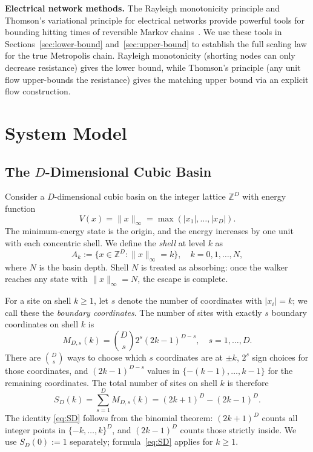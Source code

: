 \documentclass[conference]{IEEEtran}
\newcommand{\Z}{\mathbb{Z}}
\newcommand{\norm}[1]{\lVert #1\rVert}
\begin{document}
\textbf{Electrical network methods.}
The Rayleigh monotonicity principle and Thomson's variational principle for
electrical networks provide powerful tools for bounding hitting times of
reversible Markov chains~\cite{doyle1984,levin2017,tetali1991}.
We use these tools in Sections~\ref{sec:lower-bound}
and~\ref{sec:upper-bound} to establish the full
scaling law for the true Metropolis chain.
Rayleigh monotonicity (shorting nodes can only decrease resistance) gives
the lower bound, while Thomson's principle (any unit flow upper-bounds the
resistance) gives the matching upper bound via an explicit flow construction.

\section{System Model}

\subsection{The $D$-Dimensional Cubic Basin}

Consider a $D$-dimensional cubic basin on the integer lattice $\Z^D$
with energy function
\begin{equation}
\label{eq:energy}
V(x) = \norm{x}_\infty = \max(|x_1|,\dots,|x_D|).
\end{equation}
The minimum-energy state is the origin, and the energy increases
by one unit with each concentric shell.
We define the \emph{shell} at level $k$ as
\[
A_k := \{x \in \Z^D : \norm{x}_\infty = k\}, \quad k=0,1,\dots,N,
\]
where $N$ is the basin depth.
Shell $N$ is treated as absorbing: once the walker reaches any state
with $\norm{x}_\infty = N$, the escape is complete.

For a site on shell $k \ge 1$, let $s$ denote the number of coordinates
with $|x_i|=k$; we call these the \emph{boundary coordinates}.
The number of sites with exactly $s$ boundary coordinates on shell $k$ is
\begin{equation}
\label{eq:MDs}
M_{D,s}(k) = \binom{D}{s} 2^s (2k-1)^{D-s}, \quad s=1,\dots,D.
\end{equation}
There are $\binom{D}{s}$ ways to choose which $s$ coordinates are at $\pm k$,
$2^s$ sign choices for those coordinates, and $(2k-1)^{D-s}$ values
in $\{-(k-1),\dots,k-1\}$ for the remaining coordinates.
The total number of sites on shell $k$ is therefore
\begin{equation}
\label{eq:SD}
S_D(k) = \sum_{s=1}^{D} M_{D,s}(k) = (2k+1)^D - (2k-1)^D.
\end{equation}
The identity \eqref{eq:SD} follows from the binomial theorem: $(2k+1)^D$
counts all integer points in $\{-k,\dots,k\}^D$, and $(2k-1)^D$ counts
those strictly inside.
We use $S_D(0):=1$ separately; formula~\eqref{eq:SD} applies for $k\ge1$.
\end{document}
